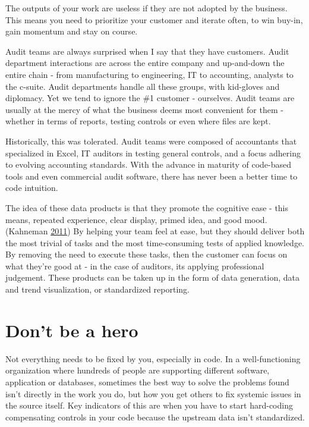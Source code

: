 \documentclass[
]{book}
\begin{document}
The outputs of your work are useless if they are not adopted by the business. This means you need to prioritize your customer and iterate often, to win buy-in, gain momentum and stay on course.

Audit teams are always surprised when I say that they have customers. Audit department interactions are across the entire company and up-and-down the entire chain - from manufacturing to engineering, IT to accounting, analysts to the c-suite. Audit departments handle all these groups, with kid-gloves and diplomacy. Yet we tend to ignore the \#1 customer - ourselves. Audit teams are usually at the mercy of what the business deems most convenient for them - whether in terms of reports, testing controls or even where files are kept.

Historically, this was tolerated. Audit teams were composed of accountants that specialized in Excel, IT auditors in testing general controls, and a focus adhering to evolving accounting standards. With the advance in maturity of code-based tools and even commercial audit software, there has never been a better time to code intuition.

The idea of these data products is that they promote the cognitive ease - this means, repeated experience, clear display, primed idea, and good mood.(Kahneman \protect\hyperlink{ref-cognitive-ease}{2011}) By helping your team feel at ease, but they should deliver both the most trivial of tasks and the most time-consuming tests of applied knowledge. By removing the need to execute these tasks, then the customer can focus on what they're good at - in the case of auditors, its applying professional judgement. These products can be taken up in the form of data generation, data and trend visualization, or standardized reporting.

\hypertarget{dont-be-a-hero}{%
\section{Don't be a hero}\label{dont-be-a-hero}}

Not everything needs to be fixed by you, especially in code. In a well-functioning organization where hundreds of people are supporting different software, application or databases, sometimes the best way to solve the problems found isn't directly in the work you do, but how you get others to fix systemic issues in the source itself. Key indicators of this are when you have to start hard-coding compensating controls in your code because the upstream data isn't standardized.
\end{document}
